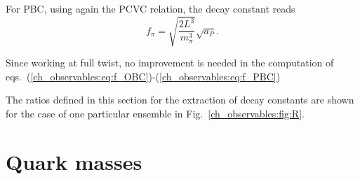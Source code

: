 For PBC, using again the PCVC relation, the decay constant reads
\begin{equation}
\label{ch_observables:eq:f_PBC}
f_{\pi}=\sqrt{\frac{2L^3}{m_{\pi}^3}}\sqrt{a_P}.
\end{equation}

Since working at full twist, no improvement is needed in the computation of eqs.~(\ref{ch_observables:eq:f_OBC})-(\ref{ch_observables:eq:f_PBC})

The ratios defined in this section for the extraction of decay constants are shown for the case of one particular ensemble in Fig.~\ref{ch_observables:fig:R}.


\section{Quark masses}
\label{ch_observables:sec:quark_mass}


